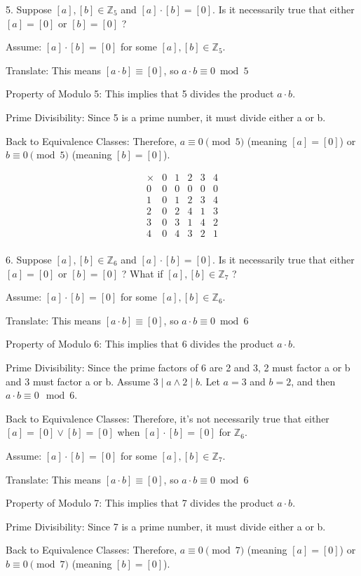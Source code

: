 \documentclass{hippoidC}
\begin{document}
\begin{prooflist}{5. Suppose $[a],[b] \in \mathbb{Z}_5$ and $[a] \cdot[b]=[0]$.
		Is it necessarily true that either $[a]=[0]$ or $[b]=[0]$ ?}
	\item Assume: $[a]\cdot[b]=[0]$ for some $[a],[b]\in\mathbb{Z}_5$.
	\item Translate: This means $[a\cdot b]\equiv[0]$, so $a\cdot b\equiv 0\bmod 5$
	\item Property of Modulo 5: This implies that 5 divides the product $a\cdot b$.
	\item Prime Divisibility: Since 5 is a prime number, it must divide either a or b.
	\item Back to Equivalence Classes: Therefore, $a \equiv 0 \pmod 5$ (meaning
	$[a]=[0]$) or $b \equiv 0 \pmod 5$ (meaning $[b]=[0]$).
	\item \[
		\begin{array}{c|ccccc}
			\times & 0 & 1 & 2 & 3 & 4 \\
			\hline
			0      & 0 & 0 & 0 & 0 & 0 \\
			1      & 0 & 1 & 2 & 3 & 4 \\
			2      & 0 & 2 & 4 & 1 & 3 \\
			3      & 0 & 3 & 1 & 4 & 2 \\
			4      & 0 & 4 & 3 & 2 & 1 \\
		\end{array}
	\]
\end{prooflist}

\begin{prooflist}{6. Suppose $[a],[b] \in \mathbb{Z}_6$ and $[a] \cdot[b]=[0]$. Is it necessarily true that either $[a]=[0]$ or $[b]=[0]$ ? What if $[a],[b] \in \mathbb{Z}_7$ ?}
	\item Assume: $[a]\cdot[b]=[0]$ for some $[a],[b]\in\mathbb{Z}_6$.
	\item Translate: This means $[a\cdot b]\equiv[0]$, so $a\cdot b\equiv 0\bmod 6$
	\item Property of Modulo 6: This implies that 6 divides the product $a\cdot b$.
	\item Prime Divisibility: Since the prime factors of 6 are 2 and 3, 2 must
	factor a or b and 3 must factor a or b. Assume $3\mid a \land 2\mid b$. Let
	$a=3$ and $b=2$, and then $a\cdot b \equiv 0 \mod 6$.
	\item Back to Equivalence Classes: Therefore, it's not necessarily true that
	either $[a] = [0] \lor [b] = [0]$ when $[a]\cdot[b]=[0]$ for $\mathbb{Z}_6$.
	\item Assume: $[a]\cdot[b]=[0]$ for some $[a],[b]\in\mathbb{Z}_7$.
	\item Translate: This means $[a\cdot b]\equiv[0]$, so $a\cdot b\equiv 0\bmod 6$
	\item Property of Modulo 7: This implies that 7 divides the product $a\cdot b$.
	\item Prime Divisibility: Since 7 is a prime number, it must divide either a or b.
	\item Back to Equivalence Classes: Therefore, $a \equiv 0 \pmod 7$ (meaning
	$[a]=[0]$) or $b \equiv 0 \pmod 7$ (meaning $[b]=[0]$).
\end{prooflist}
\end{document}
